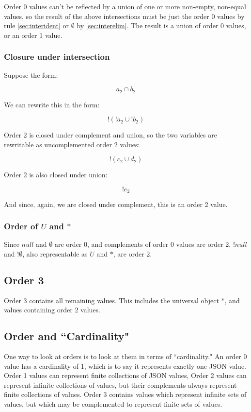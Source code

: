 \documentclass[letterpaper]{article}
\begin{document}
Order 0 values can't be reflected by a union of one or more non-empty,
non-equal values, so the result of the above intersections must be just the
order 0 values by rule \ref{sec:interident} or \(\emptyset\) by
\ref{sec:interelim}. The result is a union of order 0 values, or an order 1
value.

\subsubsection{Closure under intersection}

Suppose the form:

\begin{equation}
a_2 \cap b_2
\end{equation}

We can rewrite this in the form:

\begin{equation}
! ( !a_2 \cup !b_2 )
\end{equation}

Order 2 is closed under complement and union, so the two variables are
rewritable as uncomplemented order 2 values:

\begin{equation}
! ( c_2 \cup d_2 )
\end{equation}

Order 2 is also closed under union:

\begin{equation}
!e_2
\end{equation}

And since, again, we are closed under complement, this is an order 2 value.

\subsubsection{Order of \(U\) and \(*\)}

Since \(null\) and \(\emptyset\) are order 0, and complements of order 0 values
are order 2, \(!null\) and \(!\emptyset\), also representable as \(U\) and
\(*\), are order 2.

\subsection{Order 3}
Order 3 contains all remaining values. This includes the universal object \({ *
}\), and values containing order 2 values.

\subsection{Order and ``Cardinality"}

One way to look at orders is to look at them in terms of ``cardinality." An
order 0 value has a cardinality of 1, which is to say it represents exactly one
JSON value.  Order 1 values can represent finite collections of JSON values,
Order 2 values can represent infinite collections of values, but their
complements always represent finite collections of values. Order 3 contains
values which represent infinite sets of values, but which may be complemented
to represent finite sets of values.
\end{document}
